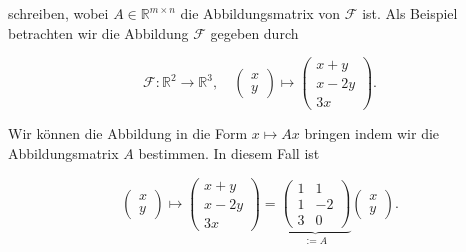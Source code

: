 \vspace{0.5\baselineskip}

schreiben, wobei \( A \in \mathbb{R}^{m \times n} \) die Abbildungsmatrix von \( \mathcal{F} \) ist. Als Beispiel betrachten wir die Abbildung \( \mathcal{F} \) gegeben durch

\begin{equation*}
    \mathcal{F}: \mathbb{R}^2 \rightarrow \mathbb{R}^3, \quad \begin{pmatrix} x \\ y \end{pmatrix} \mapsto \begin{pmatrix} x + y \\ x - 2y \\ 3x \end{pmatrix}.
\end{equation*}

\vspace{0.5\baselineskip}

Wir können die Abbildung in die Form \( x \mapsto Ax \) bringen indem wir die Abbildungsmatrix \( A \) bestimmen. In diesem Fall ist

\begin{equation*}
    \begin{pmatrix} x \\ y \end{pmatrix} \mapsto \begin{pmatrix} x + y \\ x - 2y \\ 3x \end{pmatrix} = \underbrace{\begin{pmatrix} 1 & 1 \\ 1 & -2 \\ 3 & 0 \end{pmatrix}}_{:=A} \begin{pmatrix} x \\ y \end{pmatrix}.
\end{equation*}